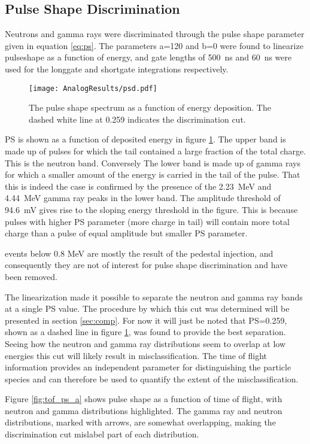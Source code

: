 \documentclass[main.tex]{subfiles}
\begin{document}
\subsection{Pulse Shape Discrimination}
Neutrons and gamma rays were discriminated through the pulse shape parameter given in equation \ref{eq:ps}. The parameters a=120 and b=0 were found to linearize pulseshape as a function of energy, and gate lengths of \SI{500}{\ns} and \SI{60}{ns} were used for the longgate and shortgate integrations respectively.

\begin{figure}[ht]
    \centering
        \texttt{[image: AnalogResults/psd.pdf]}
        \caption{The pulse shape spectrum as a function of energy deposition. The dashed white line at 0.259 indicates the discrimination cut.}
        \label{fig:psd_a}
\end{figure}

PS is shown as a function of deposited energy in figure \ref{fig:psd_a}. The upper band is made up of pulses for which the tail contained a large fraction of the total charge. This is the neutron band. Conversely The lower band is made up of gamma rays for which a smaller amount of the energy is carried in the tail of the pulse. That this is indeed the case is confirmed by the presence of the \SI{2.23}{MeV} and \SI{4.44}{MeV} gamma ray peaks in the lower band. The amplitude threshold of \SI{94.6}{mV} gives rise to the sloping energy threshold in the figure. This is because pulses with higher PS parameter (more charge in tail) will contain more total charge than a pulse of equal amplitude but smaller PS parameter.


events below 0.8 MeV are mostly the result of the pedestal injection, and consequently they are not of interest for pulse shape discrimination and have been removed.

The linearization made it possible to separate the neutron and gamma ray bands at a single PS value. The procedure by which this cut was determined will be presented in section \ref{sec:comp}. For now it will just be noted that PS=0.259, shown as a dashed line in figure \ref{fig:psd_a}, was found to provide the best separation. Seeing how the neutron and gamma ray distributions seem to overlap at low energies this cut will likely result in misclassification. The time of flight information provides an independent parameter for distinguishing the particle species and can therefore be used to quantify the extent of the misclassification.

Figure \ref{fig:tof_ps_a} shows pulse shape as a function of time of flight, with neutron and gamma distributions highlighted. The gamma ray and neutron distributions, marked with arrows, are somewhat overlapping, making the discrimination cut mislabel part of each distribution.
\end{document}
